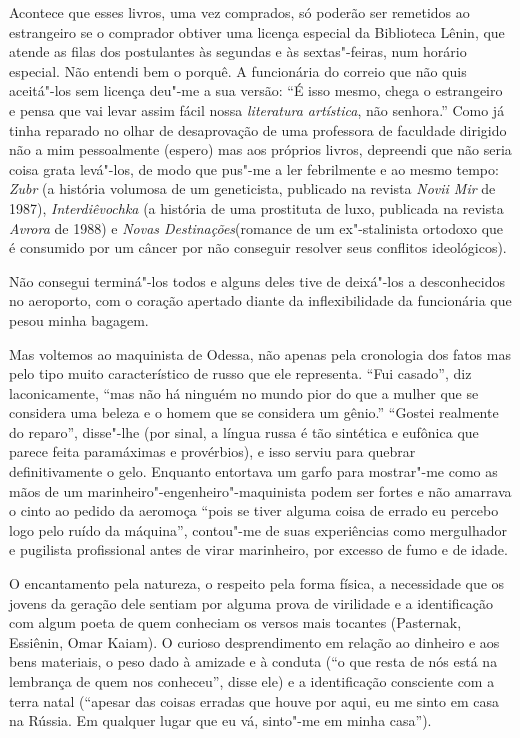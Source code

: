 Acontece que esses livros, uma vez comprados, só poderão ser remetidos
ao estrangeiro se o comprador obtiver uma licença especial da Biblioteca
Lênin, que atende as filas dos postulantes às segundas e às
sextas"-feiras, num horário especial. Não entendi bem o porquê. A
funcionária do correio que não quis aceitá"-los sem licença deu"-me a sua
versão: ``É isso mesmo, chega o estrangeiro e pensa que vai levar assim
fácil nossa \emph{literatura artística}, não senhora.'' Como já tinha
reparado no olhar de desaprovação de uma professora de faculdade
dirigido não a mim pessoalmente (espero) mas aos próprios livros,
depreendi que não seria coisa grata levá"-los, de modo que pus"-me a ler
febrilmente e ao mesmo tempo: \emph{Zubr} (a história volumosa de um
geneticista, publicado na revista \emph{Novii Mir} de 1987),
\emph{Interdiêvochka} (a história de uma prostituta de luxo, publicada
na revista \emph{Avrora} de 1988) e \emph{Novas Destinações}(romance de
um ex"-stalinista ortodoxo que é consumido por um câncer por não
conseguir resolver seus conflitos ideológicos).

Não consegui terminá"-los todos e alguns deles tive de deixá"-los a
desconhecidos no aeroporto, com o coração apertado diante da
inflexibilidade da funcionária que pesou minha bagagem.

Mas voltemos ao maquinista de Odessa, não apenas pela cronologia dos
fatos mas pelo tipo muito característico de russo que ele representa.
``Fui casado'', diz laconicamente, ``mas não há ninguém no mundo pior do
que a mulher que se considera uma beleza e o homem que se considera um
gênio.'' ``Gostei realmente do reparo'', disse"-lhe (por sinal, a língua
russa é tão sintética e eufônica que parece feita paramáximas e
provérbios), e isso serviu para quebrar definitivamente o gelo. Enquanto
entortava um garfo para mostrar"-me como as mãos de um
marinheiro"-engenheiro"-maquinista podem ser fortes e não amarrava o cinto
ao pedido da aeromoça ``pois se tiver alguma coisa de errado eu percebo
logo pelo ruído da máquina'', contou"-me de suas experiências como
mergulhador e pugilista profissional antes de virar marinheiro, por
excesso de fumo e de idade.

O encantamento pela natureza, o respeito pela forma física, a
necessidade que os jovens da geração dele sentiam por alguma prova de
virilidade e a identificação com algum poeta de quem conheciam os versos
mais tocantes (Pasternak, Essiênin, Omar Kaiam). O curioso
desprendimento em relação ao dinheiro e aos bens materiais, o peso dado
à amizade e à conduta (``o que resta de nós está na lembrança de quem
nos conheceu'', disse ele) e a identificação consciente com a terra natal
(``apesar das coisas erradas que houve por aqui, eu me sinto em casa na
Rússia. Em qualquer lugar que eu vá, sinto"-me em minha casa'').

